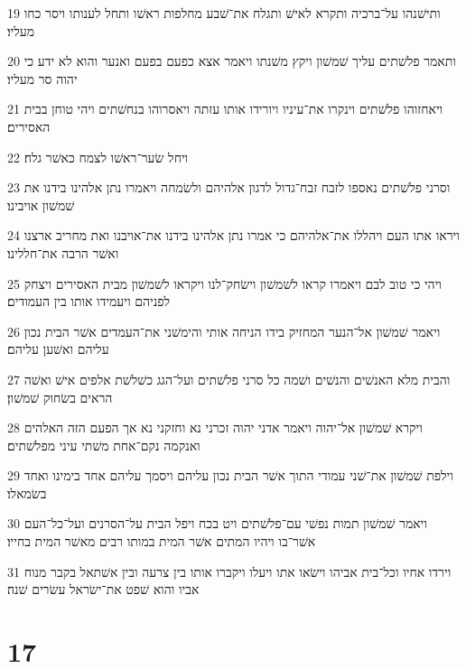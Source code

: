 \par 19 ותישׁנהו על־ברכיה ותקרא לאישׁ ותגלח את־שׁבע מחלפות ראשׁו ותחל לענותו ויסר כחו מעליו׃
\par 20 ותאמר פלשׁתים עליך שׁמשׁון ויקץ משׁנתו ויאמר אצא כפעם בפעם ואנער והוא לא ידע כי יהוה סר מעליו׃
\par 21 ויאחזוהו פלשׁתים וינקרו את־עיניו ויורידו אותו עזתה ויאסרוהו בנחשׁתים ויהי טוחן בבית האסירים׃
\par 22 ויחל שׂער־ראשׁו לצמח כאשׁר גלח׃
\par 23 וסרני פלשׁתים נאספו לזבח זבח־גדול לדגון אלהיהם ולשׂמחה ויאמרו נתן אלהינו בידנו את שׁמשׁון אויבינו׃
\par 24 ויראו אתו העם ויהללו את־אלהיהם כי אמרו נתן אלהינו בידנו את־אויבנו ואת מחריב ארצנו ואשׁר הרבה את־חללינו׃
\par 25 ויהי כי טוב לבם ויאמרו קראו לשׁמשׁון וישׂחק־לנו ויקראו לשׁמשׁון מבית האסירים ויצחק לפניהם ויעמידו אותו בין העמודים׃
\par 26 ויאמר שׁמשׁון אל־הנער המחזיק בידו הניחה אותי והימשׁני את־העמדים אשׁר הבית נכון עליהם ואשׁען עליהם׃
\par 27 והבית מלא האנשׁים והנשׁים ושׁמה כל סרני פלשׁתים ועל־הגג כשׁלשׁת אלפים אישׁ ואשׁה הראים בשׂחוק שׁמשׁון׃
\par 28 ויקרא שׁמשׁון אל־יהוה ויאמר אדני יהוה זכרני נא וחזקני נא אך הפעם הזה האלהים ואנקמה נקם־אחת משׁתי עיני מפלשׁתים׃
\par 29 וילפת שׁמשׁון את־שׁני עמודי התוך אשׁר הבית נכון עליהם ויסמך עליהם אחד בימינו ואחד בשׂמאלו׃
\par 30 ויאמר שׁמשׁון תמות נפשׁי עם־פלשׁתים ויט בכח ויפל הבית על־הסרנים ועל־כל־העם אשׁר־בו ויהיו המתים אשׁר המית במותו רבים מאשׁר המית בחייו׃
\par 31 וירדו אחיו וכל־בית אביהו וישׂאו אתו ויעלו ויקברו אותו בין צרעה ובין אשׁתאל בקבר מנוח אביו והוא שׁפט את־ישׂראל עשׂרים שׁנה׃

\chapter{17}


